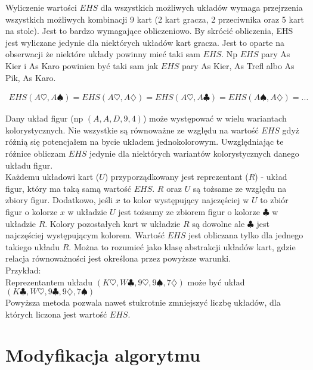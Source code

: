 \documentclass[licencjacka]{pracamgr}
\begin{document}
\noindent
Wyliczenie wartości $EHS$ dla wszystkich możliwych układów wymaga przejrzenia wszystkich możliwych kombinacji 9 kart (2 kart gracza, 2 przeciwnika
oraz 5 kart na stole). Jest to bardzo wymagające obliczeniowo. By skrócić obliczenia, EHS jest wyliczane jedynie dla niektórych układów
kart gracza. Jest to oparte na obserwacji że niektóre układy powinny mieć taki sam $EHS$. Np $EHS$ pary As Kier i As Karo powinien być taki
sam jak $EHS$ pary As Kier, As Trefl albo As Pik, As Karo. 

\begin{align*}
EHS(A\heartsuit, A\spadesuit) = EHS(A\heartsuit, A\diamondsuit) = EHS(A\heartsuit, A\clubsuit) = EHS(A\spadesuit, A\diamondsuit) = ...
\end{align*}

\noindent
Dany układ figur (np $(A,A,D,9,4)$) może występować w wielu wariantach kolorystycznych. Nie wszystkie są równoważne ze względu
na wartość $EHS$ gdyż różnią się potencjałem na bycie układem jednokolorowym. Uwzględniając te różnice obliczam $EHS$ jedynie
dla niektórych wariantów kolorystycznych danego układu figur. \\

\noindent
Każdemu układowi kart ($U$) przyporządkowany jest reprezentant ($R$) - układ figur, który ma taką samą wartość $EHS$.
$R$ oraz $U$ są tożsame ze względu na zbiory figur. Dodatkowo, jeśli $x$ to kolor występujący najczęściej w $U$
to zbiór figur o kolorze $x$ w układzie $U$ jest tożsamy ze zbiorem figur o kolorze $\clubsuit$ w układzie $R$.
Kolory pozostałych kart w układzie $R$ są dowolne ale $\clubsuit$ jest najczęściej występującym kolorem. Wartość
$EHS$ jest obliczana tylko dla jednego takiego układu $R$. Można to rozumieć jako klasę abstrakcji układów kart, gdzie
relacja równoważności jest określona przez powyższe warunki. \\

\noindent
Przykład: \\

\noindent
Reprezentantem układu $(K\heartsuit, W\clubsuit, 9\heartsuit, 9\spadesuit, 7\diamondsuit)$ może być układ
$(K\clubsuit, W\heartsuit, 9\clubsuit, 9\diamondsuit, 7\spadesuit)$ \\

\noindent
Powyższa metoda pozwala nawet stukrotnie zmniejszyć liczbę układów, dla których liczona jest wartość $EHS$.

\section{Modyfikacja algorytmu}
\end{document}
